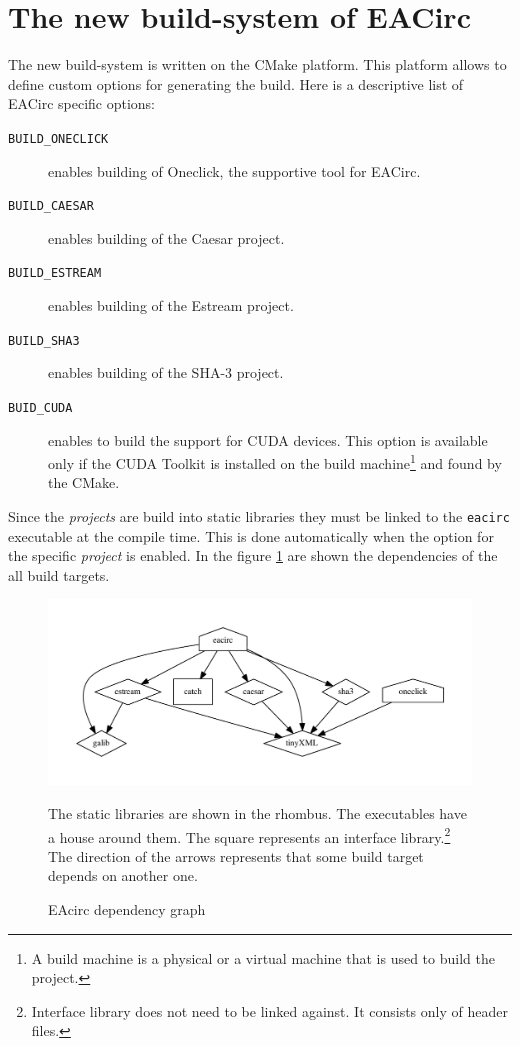 \documentclass[12pt,oneside]{fithesis2}
\begin{document}
\section{The new build-system of EACirc}

The new build-system is written on the CMake platform. This platform allows to define custom options for generating the build. Here is a descriptive list of EACirc specific options:

\begin{description}
	\item[\texttt{BUILD\_ONECLICK}] enables building of Oneclick, the supportive tool for EACirc.
	\item[\texttt{BUILD\_CAESAR}] enables building of the Caesar project.
	\item[\texttt{BUILD\_ESTREAM}] enables building of the Estream project.
	\item[\texttt{BUILD\_SHA3}] enables building of the SHA-3 project.
	\item[\texttt{BUID\_CUDA}] enables to build the support for CUDA devices. This option is available only if the CUDA Toolkit \cite{cuda_toolkit} is installed on the build machine\footnote{A build machine is a physical or a virtual machine that is used to build the project.} and found by the CMake.
\end{description}

\noindent
Since the \emph{projects} are build into static libraries they must be linked to the \texttt{eacirc} executable at the compile time. This is done automatically when the option for the specific \emph{project} is enabled. In the figure \ref{fig:deps} are shown the dependencies of the all build targets.
	\begin{figure}[H]
	\begin{center}
		\includegraphics[width=.8\textwidth]{figures/deps}
	\end{center}
	\caption{EAcirc dependency graph}
	\label{fig:deps}
	\small
	The static libraries are shown in the rhombus. The executables have a house around them. The square represents an interface library.\footnote{Interface library does not need to be linked against. It consists only of header files.} The direction of the arrows represents that some build target depends on another one.
	\end{figure}
\end{document}
